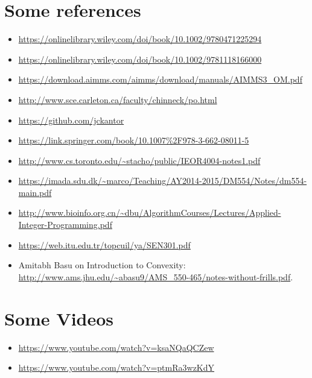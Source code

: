 
\section{Some references}
\begin{itemize}
\item \url{https://onlinelibrary.wiley.com/doi/book/10.1002/9780471225294}
\item \url{https://onlinelibrary.wiley.com/doi/book/10.1002/9781118166000}
\item \url{https://download.aimms.com/aimms/download/manuals/AIMMS3_OM.pdf}
\item \url{http://www.sce.carleton.ca/faculty/chinneck/po.html}
\item \url{https://github.com/jckantor}
\item \url{https://link.springer.com/book/10.1007\%2F978-3-662-08011-5}
\item \url{http://www.cs.toronto.edu/~stacho/public/IEOR4004-notes1.pdf}
\item \url{https://imada.sdu.dk/~marco/Teaching/AY2014-2015/DM554/Notes/dm554-main.pdf}
\item \url{http://www.bioinfo.org.cn/~dbu/AlgorithmCourses/Lectures/Applied-Integer-Programming.pdf}
\item \url{https://web.itu.edu.tr/topcuil/ya/SEN301.pdf}
\item Amitabh Basu on Introduction to Convexity: \url{http://www.ams.jhu.edu/~abasu9/AMS_550-465/notes-without-frills.pdf}.
\end{itemize}

\section{Some Videos}
\begin{itemize}
\item \url{https://www.youtube.com/watch?v=ksaNQaQCZew}
\item \url{https://www.youtube.com/watch?v=ptmRa3wzKdY}
\end{itemize}
